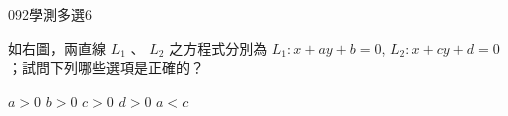 \begin{QUESTIONS}
    \begin{QUESTION}
        \begin{ExamInfo}{092}{學測}{多選}{6}
        \end{ExamInfo}
        \begin{ExamAnsRateInfo}{41}{71}{40}{12}
        \end{ExamAnsRateInfo}
        \begin{QBODY}
            如右圖，兩直線 $L_1$ 、 $L_2$ 之方程式分別為 $L_1 : x+ay+b=0$, $L_2 :x+cy+d=0$；試問下列哪些選項是正確的？ 
            \begin{QOPS} 
                \QOP $a>0$ 
                \QOP $b>0$ 
                \QOP $c>0$ 
                \QOP $d>0$ 
                \QOP $a<c$ 
            \end{QOPS}
            
            

\end{QBODY}
\end{QUESTION}
\end{QUESTIONS}
